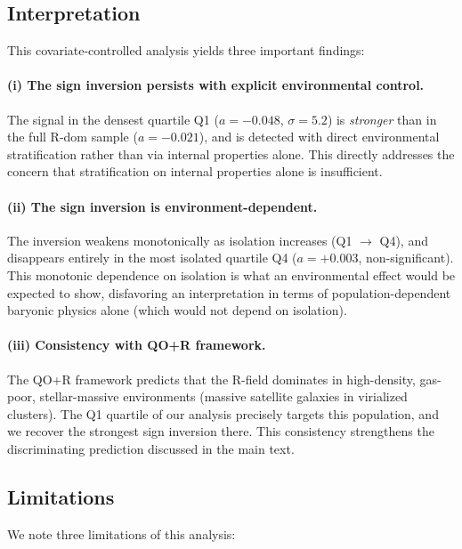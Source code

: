 \subsection*{Interpretation}

This covariate-controlled analysis yields three important findings:

\paragraph{(i) The sign inversion persists with explicit environmental control.}
The signal in the densest quartile Q1 ($a = -0.048$, $\sigma = 5.2$) is
\emph{stronger} than in the full R-dom sample ($a = -0.021$), and is
detected with direct environmental stratification rather than via
internal properties alone. This directly addresses the
concern that stratification on internal properties alone is insufficient.

\paragraph{(ii) The sign inversion is environment-dependent.}
The inversion weakens monotonically as isolation increases (Q1 $\to$ Q4),
and disappears entirely in the most isolated quartile Q4 ($a = +0.003$,
non-significant). This monotonic dependence on isolation is what an environmental effect would be expected to show, disfavoring an interpretation in terms of population-dependent baryonic physics alone (which would not depend on isolation).

\paragraph{(iii) Consistency with QO+R framework.}
The QO+R framework predicts that the R-field dominates in
high-density, gas-poor, stellar-massive environments (massive
satellite galaxies in virialized clusters). The Q1 quartile of our
analysis precisely targets this population, and we recover the
strongest sign inversion there. This consistency strengthens the
discriminating prediction discussed in the main text.

\subsection*{Limitations}

We note three limitations of this analysis:

